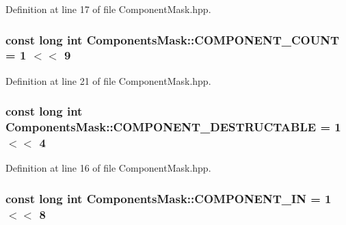 Definition at line 17 of file Component\+Mask.\+hpp.

\hypertarget{class_components_mask_a7a90217e6d5da07c838e12fe2f355448}{
\subsubsection[{C\+O\+M\+P\+O\+N\+E\+N\+T\+\_\+\+C\+O\+U\+N\+T}]{\setlength{\rightskip}{0pt plus 5cm}const long int Components\+Mask\+::\+C\+O\+M\+P\+O\+N\+E\+N\+T\+\_\+\+C\+O\+U\+N\+T = 1 $<$$<$ 9\hspace{0.3cm}{\ttfamily [static]}}}\label{class_components_mask_a7a90217e6d5da07c838e12fe2f355448}


Definition at line 21 of file Component\+Mask.\+hpp.

\hypertarget{class_components_mask_af9ec785367e18857389d34be89269879}{
\subsubsection[{C\+O\+M\+P\+O\+N\+E\+N\+T\+\_\+\+D\+E\+S\+T\+R\+U\+C\+T\+A\+B\+L\+E}]{\setlength{\rightskip}{0pt plus 5cm}const long int Components\+Mask\+::\+C\+O\+M\+P\+O\+N\+E\+N\+T\+\_\+\+D\+E\+S\+T\+R\+U\+C\+T\+A\+B\+L\+E = 1 $<$$<$ 4\hspace{0.3cm}{\ttfamily [static]}}}\label{class_components_mask_af9ec785367e18857389d34be89269879}


Definition at line 16 of file Component\+Mask.\+hpp.

\hypertarget{class_components_mask_a6a8d73981d65f39acb16bbeeced5a95b}{
\subsubsection[{C\+O\+M\+P\+O\+N\+E\+N\+T\+\_\+\+I\+N}]{\setlength{\rightskip}{0pt plus 5cm}const long int Components\+Mask\+::\+C\+O\+M\+P\+O\+N\+E\+N\+T\+\_\+\+I\+N = 1 $<$$<$ 8\hspace{0.3cm}{\ttfamily [static]}}}\label{class_components_mask_a6a8d73981d65f39acb16bbeeced5a95b}


